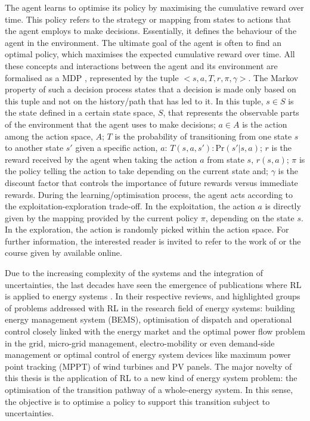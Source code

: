 The agent learns to optimise its policy by maximising the cumulative reward over time. This policy refers to the strategy or mapping from states to actions that the agent employs to make decisions. Essentially, it defines the behaviour of the agent in the environment. The ultimate goal of the agent is often to find an optimal policy, which maximises the expected cumulative reward over time.  All these concepts and interactions between the agent and its environment are formalised as a \gls{MDP} \cite{sutton2018reinforcement}, represented by the tuple $<s,a,T,r,\pi,\gamma>$.  The Markov property of such a decision process states that a decision is made only based on this tuple and not on the history/path that has led to it. In this tuple, $s\in S$ is the state defined in a certain state space, $S$, that represents the observable parts of the environment that the agent uses to make decisions; $a\in A$ is the action among the action space, $A$; $T$ is the probability of transitioning from one state $s$ to another state $s'$ given a specific action, $a$: $T(s,a,s'): \text{Pr}\left(s'|s,a\right)$; $r$ is the reward received by the agent when taking the action $a$ from state $s$, $r(s,a)$; $\pi$ is the policy telling the action to take depending on the current state and; $\gamma$ is the discount factor that controls the importance of future rewards versus immediate rewards. During the learning/optimisation process, the agent acts according to the exploitation-exploration trade-off. In the exploitation, the action $a$ is directly given by the mapping provided by the current policy $\pi$,  depending on the state $s$. In the exploration, the action is randomly picked within the action space. For further information, the interested reader is invited to refer to the work of \citet{sutton2018reinforcement} or the course given by \citet{davidsilver_RL_online} available online.

Due to the increasing complexity of the systems and the integration of uncertainties, the last decades have seen the emergence of publications where \gls{RL} is applied to energy systems \cite{cao2020reinforcement,perera2021applications}. In their respective reviews, \citet{cao2020reinforcement} and \citet{perera2021applications} highlighted groups of problems addressed with \gls{RL} in the research field of energy systems: building energy management system (BEMS), optimisation of dispatch and operational control closely linked with the energy market and the optimal power flow problem in the grid, micro-grid management, electro-mobility or even demand-side management or optimal control of energy system devices like maximum power point tracking (MPPT) of wind turbines and \gls{PV} panels.  The major novelty of this thesis is the application of \gls{RL} to a new kind of energy system problem: the optimisation of the transition pathway of a whole-energy system. In this sense, the objective is to optimise a policy to support this transition subject to uncertainties.

